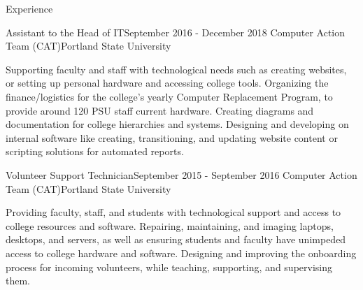 \documentclass{resume} %
\begin{document}
\begin{rSection}{Experience}

\begin{sSubsection} 
    {Assistant to the Head of IT}{September 2016 - December 2018}
    {Computer Action Team (CAT)}{Portland State University}

Supporting faculty and staff with technological needs such as creating websites, or setting up personal hardware and accessing college tools. Organizing the finance/logistics for the college's yearly Computer Replacement Program, to provide around 120 PSU staff current hardware. Creating diagrams and documentation for college hierarchies and systems. Designing and developing on internal software like creating, transitioning, and updating website content or scripting solutions for automated reports.

\end{sSubsection}

\vspace{2mm}

\begin{sSubsection}
    {Volunteer Support Technician}{September 2015 - September 2016}
    {Computer Action Team (CAT)}{Portland State University}

Providing faculty, staff, and students with technological support and access to college resources and software. Repairing, maintaining, and imaging laptops, desktops, and servers, as well as ensuring students and faculty have unimpeded access to college hardware and software. Designing and improving the onboarding process for incoming volunteers, while teaching, supporting, and supervising them.

\end{sSubsection}

\end{rSection}

\end{document}
